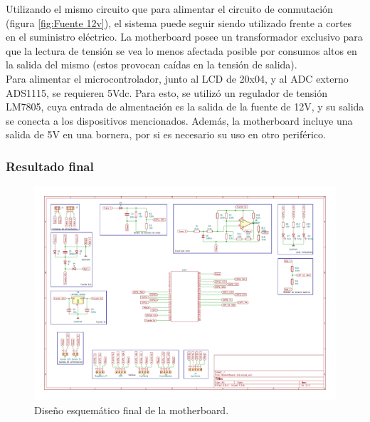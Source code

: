 Utilizando el mismo circuito que para alimentar el circuito de conmutación (figura \ref{fig:Fuente 12v}), el sistema puede seguir siendo utilizado frente a cortes en el suministro eléctrico. La motherboard posee un transformador exclusivo para que la lectura de tensión se vea lo menos afectada posible por consumos altos en la salida del mismo (estos provocan caídas en la tensión de salida).\\

Para alimentar el microcontrolador, junto al LCD de 20x04, y al ADC externo ADS1115, se requieren 5Vdc. Para esto, se utilizó un regulador de tensión LM7805, cuya entrada de almentación es la salida de la fuente de 12V, y su salida se conecta a los dispositivos mencionados. Además, la motherboard incluye una salida de 5V en una bornera, por si es necesario su uso en otro periférico.\\

\subsubsection{Resultado final}

\begin{figure}[H]
    \centering
    \includegraphics[width=1\linewidth]{hardware/MotherBoard 2.0.pdf}
    \caption{Diseño esquemático final de la motherboard.}
    \label{fig:mother-sch}
\end{figure}

